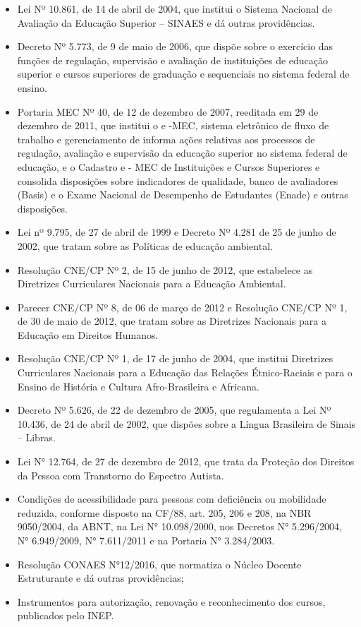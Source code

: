 \begin{itemize}
	\item Lei Nº 10.861, de 14 de abril de 2004, que institui o Sistema Nacional de Avaliação da Educação Superior – SINAES e dá outras providências. 
	\item Decreto Nº 5.773, de 9 de maio de 2006, que dispõe sobre o exercício das funções de regulação, supervisão e avaliação de instituições de educação superior e cursos superiores de graduação e sequenciais no sistema federal de ensino. 
	\item Portaria MEC Nº 40, de 12 de dezembro de 2007, reeditada em 29 de dezembro de 2011, que institui o e -MEC, sistema eletrônico de fluxo de trabalho e gerenciamento de informa ações relativas aos processos de regulação, avaliação e supervisão da educação superior no sistema federal de educação, e o Cadastro e - MEC de Instituições e Cursos Superiores e consolida disposições sobre indicadores de qualidade, banco de avaliadores (Basis) e o Exame Nacional de Desempenho de Estudantes (Enade) e outras disposições. 
	\item Lei nº 9.795, de 27 de abril de 1999 e Decreto Nº 4.281 de 25 de junho de 2002, que tratam sobre as Políticas de educação ambiental.  
	\item Resolução CNE/CP Nº 2, de 15 de junho de 2012, que estabelece as Diretrizes Curriculares Nacionais para a Educação Ambiental. 
	\item Parecer CNE/CP Nº 8, de 06 de março de 2012 e Resolução CNE/CP Nº 1, de 30 de maio de 2012, que tratam sobre as Diretrizes Nacionais para a Educação em Direitos Humanos. 
	\item Resolução CNE/CP Nº 1, de 17 de junho de 2004, que institui Diretrizes Curriculares Nacionais para a Educação das Relações Étnico-Raciais e para o Ensino de História e Cultura Afro-Brasileira e Africana. 
	\item Decreto Nº 5.626, de 22 de dezembro de 2005, que regulamenta a Lei Nº 10.436, de 24 de abril de 2002, que dispões sobre a Língua Brasileira de Sinais – Libras. 
	\item Lei N° 12.764, de 27 de dezembro de 2012, que trata da Proteção dos Direitos da Pessoa com Transtorno do Espectro Autista. 
	\item Condições de acessibilidade para pessoas com deficiência ou mobilidade reduzida, conforme disposto na CF/88, art. 205, 206 e 208, na NBR 9050/2004, da ABNT, na Lei N° 10.098/2000, nos Decretos N° 5.296/2004, N° 6.949/2009, N° 7.611/2011 e na Portaria N° 3.284/2003.
	\item Resolução CONAES N°12/2016, que normatiza o Núcleo Docente Estruturante e dá outras providências;
	\item Instrumentos para autorização, renovação e reconhecimento dos cursos, publicados pelo INEP.
\end{itemize}

